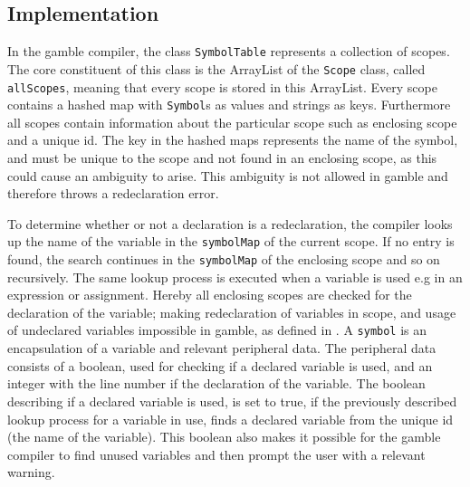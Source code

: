 \subsection*{Implementation}
In the \gls{gamble} compiler, the class \texttt{SymbolTable} represents a collection of scopes.
The core constituent of this class is the ArrayList of the \texttt{Scope} class, called \texttt{allScopes}, meaning that every scope is stored in this ArrayList.
Every scope contains a hashed map with \texttt{Symbol}s as values and strings as keys.
Furthermore all scopes contain information about the particular scope such as enclosing scope and a unique id. 
The key in the hashed maps represents the name of the symbol, and must be unique to the scope and not found in an enclosing scope, as this could cause an ambiguity to arise.
This ambiguity is not allowed in \gls{gamble} and therefore throws a redeclaration error.

To determine whether or not a declaration is a redeclaration, the compiler looks up the name of the variable in the \texttt{symbolMap} of the current scope.
If no entry is found, the search continues in the \texttt{symbolMap} of the enclosing scope and so on recursively.
The same lookup process is executed when a variable is used e.g in an expression or assignment.
Hereby all enclosing scopes are checked for the declaration of the variable; making redeclaration of variables in scope, and usage of undeclared variables impossible in \gls{gamble}, as defined in .
A \texttt{symbol} is an encapsulation of a variable and relevant peripheral data.
The peripheral data consists of a boolean, used for checking if a declared variable is used, and an integer with the line number if the declaration of the variable.
The boolean describing if a declared variable is used, is set to true, if the previously described lookup process for a variable in use, finds a declared variable from the unique id (the name of the variable).
This boolean also makes it possible for the \gls{gamble} compiler to find unused variables and then prompt the user with a relevant warning.

